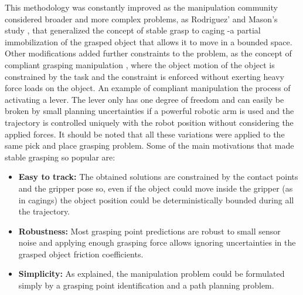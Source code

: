 \documentclass[12,twoside]{TFG-GM}
\theoremstyle{definition}
\theoremstyle{remark}
\begin{document}
This methodology was constantly improved as the manipulation community considered broader and more complex problems, as Rodriguez' and Mason's study \cite{caging}, that generalized the concept of stable grasp to caging -a partial immobilization of the grasped object that allows it to move in a bounded space. Other modifications added further constraints to the problem, as the concept of compliant grasping manipulation \cite{compliant_control}, where the object motion of the object is constrained by the task and the constraint is enforced without exerting heavy force loads on the object. An example of compliant manipulation the process of activating a lever. The lever only has one degree of freedom and can easily be broken by small planning uncertainties if a powerful robotic arm is used and the trajectory is controlled uniquely with the robot position without considering the applied forces. It should be noted that all these variations were applied to the same pick and place grasping problem. Some of the main motivations that made stable grasping so popular are:
\begin{itemize}
\item {\textbf{Easy to track:}} The obtained solutions are constrained by the contact points and the gripper pose so, even if the object could move inside the gripper (as in cagings) the object position could be deterministically bounded during all the trajectory.
\item {\textbf{Robustness:}} Most grasping point predictions are robust to small sensor noise and applying enough grasping force allows ignoring uncertainties in the grasped object friction coefficients.
\item {\textbf{Simplicity:}} As explained, the manipulation problem could be formulated simply by a grasping point identification and a path planning problem.
\end{itemize}
\end{document}
